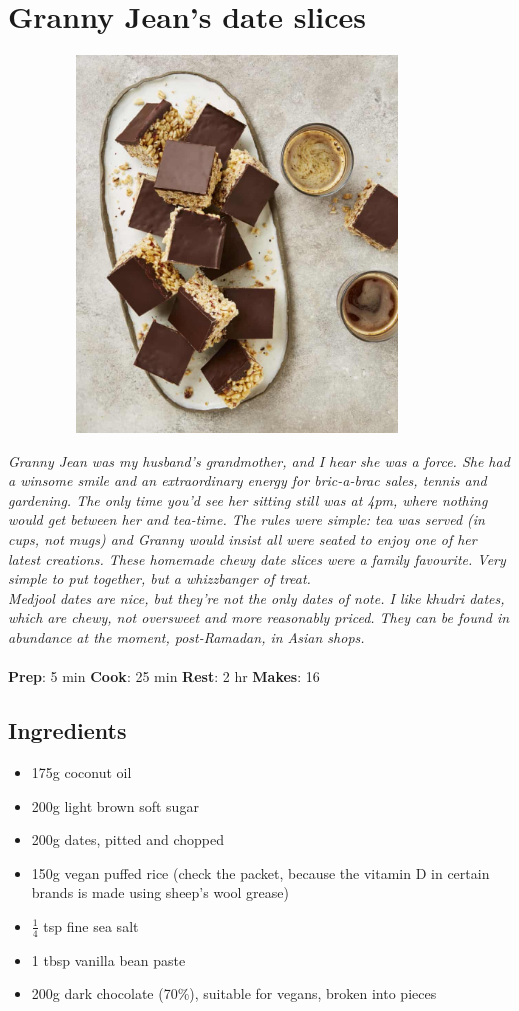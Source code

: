 \documentclass{book}
\begin{document}
\section{Granny Jean’s date slices}
\begin{figure}
\centering\includegraphics[width=10cm,height=10cm,keepaspectratio]{Recipe_Pictures/Granny_Jeans_date_slices.png}
\end{figure}
\emph{Granny Jean was my husband’s grandmother, and I hear she was a force. She had a winsome smile and an extraordinary energy for bric-a-brac sales, tennis and gardening. The only time you’d see her sitting still was at 4pm, where nothing would get between her and tea-time. The rules were simple: tea was served (in cups, not mugs) and Granny would insist all were seated to enjoy one of her latest creations. These homemade chewy date slices were a family favourite. Very simple to put together, but a whizzbanger of treat.\\ 
Medjool dates are nice, but they’re not the only dates of note. I like khudri dates, which are chewy, not oversweet and more reasonably priced. They can be found in abundance at the moment, post-Ramadan, in Asian shops.}\\\\ 
\textbf{Prep}: 5 min
\textbf{Cook}: 25 min
\textbf{Rest}: 2 hr
\textbf{Makes}: 16
\subsection*{Ingredients}
\begin{itemize}
\item 175g coconut oil
\item 200g light brown soft sugar
\item 200g dates, pitted and chopped
\item 150g vegan puffed rice (check the packet, because the vitamin D in certain brands is made using sheep’s wool grease) 
\item $\frac{1}{4}$ tsp fine sea salt
\item 1 tbsp vanilla bean paste
\item 200g dark chocolate (70\%), suitable for vegans, broken into pieces
\end{itemize}
\end{document}
